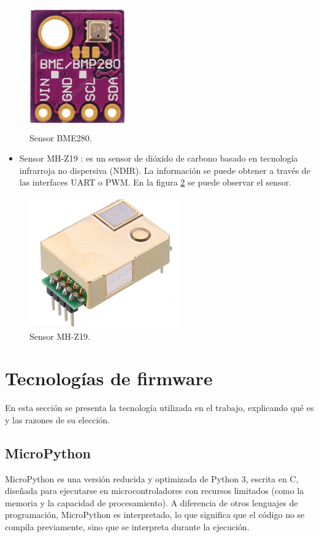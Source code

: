 \begin{figure}[H]
    \centering
    \includegraphics[width=.2\textwidth]{./Figures/sensor_bme280.png}
    \caption{Sensor BME280.}
    \label{fig:bme280}
\end{figure}

\begin{itemize}
	\item Sensor MH-Z19 \citep{sensor_mhz19}: es un sensor de dióxido de carbono basado en tecnología infrarroja no dispersiva (NDIR). La información se puede obtener a través de las interfaces UART o PWM. En la figura \ref{fig:mhz19} se puede observar el sensor.
\end{itemize}

\begin{figure}[H]
    \centering
    \includegraphics[width=.3\textwidth]{./Figures/sensor_mhz19.png}
    \caption{Sensor MH-Z19.}
    \label{fig:mhz19}
\end{figure}


\section{Tecnologías de firmware}

En esta sección se presenta la tecnología utilizada en el trabajo, explicando qué es y las razones de su elección.

\subsection{MicroPython}

MicroPython es una versión reducida y optimizada de Python 3, escrita en C, diseñada para ejecutarse en microcontroladores con recursos limitados (como la memoria y  la capacidad de procesamiento). A diferencia de otros lenguajes de programación, MicroPython es interpretado, lo que significa que el código no se compila previamente, sino que se interpreta durante la ejecución.

